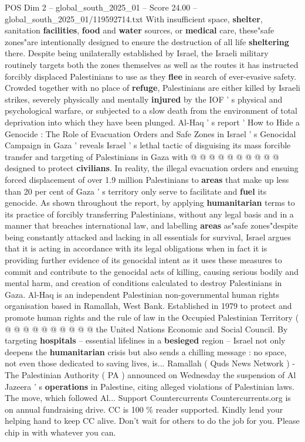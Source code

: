 \begin{textsample}{POS Dim 2 – global\_south\_2025\_01 – Score 24.00 – global\_south\_2025\_01/119592714.txt}
With insufficient space, \textbf{shelter}, sanitation \textbf{facilities}, \textbf{food} and \textbf{water} sources, or \textbf{medical} care, these"safe zones"are intentionally designed to ensure the destruction of all life \textbf{sheltering} there.
Despite being unilaterally established by Israel, the Israeli military routinely targets both the zones themselves as well as the routes it has instructed forcibly displaced Palestinians to use as they \textbf{flee} in search of ever-evasive safety.
Crowded together with no place of \textbf{refuge}, Palestinians are either killed by Israeli strikes, severely physically and mentally \textbf{injured} by the IOF ' s physical and psychological warfare, or subjected to a slow death from the environment of total deprivation into which they have been plunged.
Al-Haq ' s report ' How to Hide a Genocide : The Role of Evacuation Orders and Safe Zones in Israel ' s Genocidal Campaign in Gaza ' reveals Israel ' s lethal tactic of disguising its mass forcible transfer and targeting of Palestinians in Gaza with @ @ @ @ @ @ @ @ @ @ designed to protect \textbf{civilians}.
In reality, the illegal evacuation orders and ensuing forced displacement of over 1.9 million Palestinians to \textbf{areas} that make up less than 20 per cent of Gaza ' s territory only serve to facilitate and \textbf{fuel} its genocide.
As shown throughout the report, by applying \textbf{humanitarian} terms to its practice of forcibly transferring Palestinians, without any legal basis and in a manner that breaches international law, and labelling \textbf{areas} as"safe zones"despite being constantly attacked and lacking in all essentials for survival, Israel argues that it is acting in accordance with its legal obligations when in fact it is providing further evidence of its genocidal intent as it uses these measures to commit and contribute to the genocidal acts of killing, causing serious bodily and mental harm, and creation of conditions calculated to destroy Palestinians in Gaza.
Al-Haq is an independent Palestinian non-governmental human rights organisation based in Ramallah, West Bank.
Established in 1979 to protect and promote human rights and the rule of law in the Occupied Palestinian Territory ( @ @ @ @ @ @ @ @ @ @ the United Nations Economic and Social Council.
By targeting \textbf{hospitals} -- essential lifelines in a \textbf{besieged} region -- Israel not only deepens the \textbf{humanitarian} crisis but also sends a chilling message : no space, not even those dedicated to saving lives, is...
Ramallah ( Quds News Network ) - The Palestinian Authority ( PA ) announced on Wednesday the suspension of Al Jazeera ' s \textbf{operations} in Palestine, citing alleged violations of Palestinian laws.
The move, which followed Al...
Support Countercurrents Countercurrents.org is on annual fundraising drive.
CC is 100 \% reader supported.
Kindly lend your helping hand to keep CC alive.
Don't wait for others to do the job for you.
Please chip in with whatever you can.


\end{textsample}
